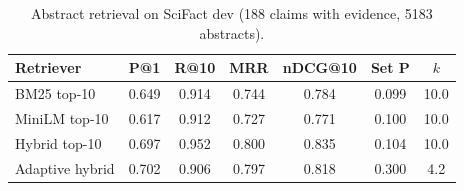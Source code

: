 \begin{table}[t]
\centering\small
\setlength{\tabcolsep}{3pt}
\begin{tabular}{lcccccc}
\toprule
Retriever & P@1 & R@10 & MRR & nDCG@10 & Set P & $k$ \\
\midrule
BM25 top-10 & 0.649 & 0.914 & 0.744 & 0.784 & 0.099 & 10.0 \\
MiniLM top-10 & 0.617 & 0.912 & 0.727 & 0.771 & 0.100 & 10.0 \\
Hybrid top-10 & 0.697 & 0.952 & 0.800 & 0.835 & 0.104 & 10.0 \\
Adaptive hybrid & 0.702 & 0.906 & 0.797 & 0.818 & 0.300 & 4.2 \\
\bottomrule
\end{tabular}
\caption{Abstract retrieval on SciFact dev (188 claims with evidence, 5183 abstracts).}
\label{tab:retrieval}
\end{table}
